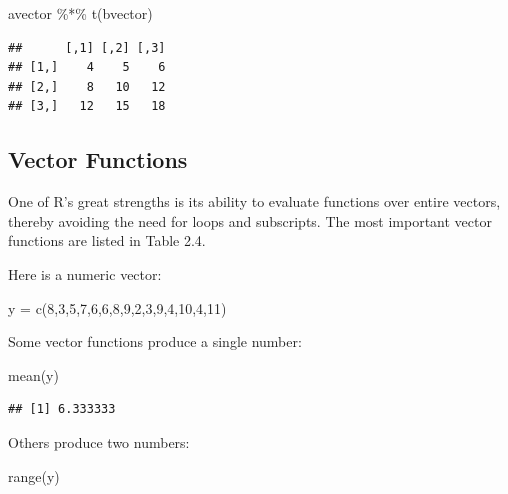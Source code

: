 \documentclass[
]{book}
\newenvironment{Shaded}{\begin{snugshade}}{\end{snugshade}}
\newcommand{\DecValTok}[1]{\textcolor[rgb]{0.00,0.00,0.81}{#1}}
\newcommand{\FunctionTok}[1]{\textcolor[rgb]{0.00,0.00,0.00}{#1}}
\newcommand{\NormalTok}[1]{#1}
\newcommand{\OtherTok}[1]{\textcolor[rgb]{0.56,0.35,0.01}{#1}}
\newcommand{\SpecialCharTok}[1]{\textcolor[rgb]{0.00,0.00,0.00}{#1}}
\theoremstyle{definition}
\theoremstyle{definition}
\theoremstyle{definition}
\theoremstyle{definition}
\theoremstyle{remark}
\begin{document}
\begin{Shaded}
\begin{Highlighting}[]
\NormalTok{avector }\SpecialCharTok{\%*\%} \FunctionTok{t}\NormalTok{(bvector)}
\end{Highlighting}
\end{Shaded}

\begin{verbatim}
##      [,1] [,2] [,3]
## [1,]    4    5    6
## [2,]    8   10   12
## [3,]   12   15   18
\end{verbatim}

\hypertarget{vector-functions}{%
\subsection{Vector Functions}\label{vector-functions}}

One of R's great strengths is its ability to evaluate functions over entire vectors, thereby avoiding the need for loops and subscripts. The most important vector functions are listed in Table 2.4.

Here is a numeric vector:

\begin{Shaded}
\begin{Highlighting}[]
\NormalTok{y }\OtherTok{=} \FunctionTok{c}\NormalTok{(}\DecValTok{8}\NormalTok{,}\DecValTok{3}\NormalTok{,}\DecValTok{5}\NormalTok{,}\DecValTok{7}\NormalTok{,}\DecValTok{6}\NormalTok{,}\DecValTok{6}\NormalTok{,}\DecValTok{8}\NormalTok{,}\DecValTok{9}\NormalTok{,}\DecValTok{2}\NormalTok{,}\DecValTok{3}\NormalTok{,}\DecValTok{9}\NormalTok{,}\DecValTok{4}\NormalTok{,}\DecValTok{10}\NormalTok{,}\DecValTok{4}\NormalTok{,}\DecValTok{11}\NormalTok{)}
\end{Highlighting}
\end{Shaded}

Some vector functions produce a single number:

\begin{Shaded}
\begin{Highlighting}[]
\FunctionTok{mean}\NormalTok{(y)}
\end{Highlighting}
\end{Shaded}

\begin{verbatim}
## [1] 6.333333
\end{verbatim}

Others produce two numbers:

\begin{Shaded}
\begin{Highlighting}[]
\FunctionTok{range}\NormalTok{(y)}
\end{Highlighting}
\end{Shaded}
\end{document}
